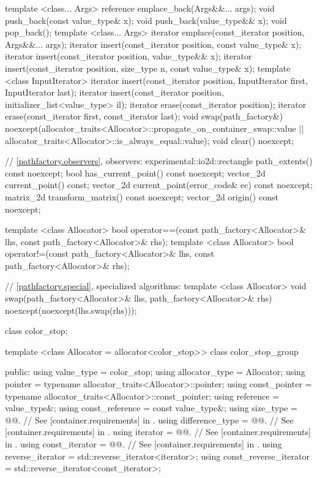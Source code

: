 \begin{codeblock}
{{{{{    template <class... Args>
    reference emplace_back(Args&&... args);
    void push_back(const value_type& x);
    void push_back(value_type&& x);
    void pop_back();
    template <class... Args>
    iterator emplace(const_iterator position, Args&&... args);
    iterator insert(const_iterator position, const value_type& x);
    iterator insert(const_iterator position, value_type&& x);
    iterator insert(const_iterator position, size_type n, const value_type& x);
    template <class InputIterator>
    iterator insert(const_iterator position, InputIterator first,
      InputIterator last);
    iterator insert(const_iterator position,
      initializer_list<value_type> il);
    iterator erase(const_iterator position);
    iterator erase(const_iterator first, const_iterator last);
    void swap(path_factory&)
      noexcept(allocator_traits<Allocator>::propagate_on_container_swap::value 
        || allocator_traits<Allocator>::is_always_equal::value);
    void clear() noexcept;

    // \ref{pathfactory.observers}, observers:
    experimental::io2d::rectangle path_extents() const noexcept;
    bool has_current_point() const noexcept;
    vector_2d current_point() const;
    vector_2d current_point(error_code& ec) const noexcept;
    matrix_2d transform_matrix() const noexcept;
    vector_2d origin() const noexcept;
  }

  template <class Allocator>
  bool operator==(const path_factory<Allocator>& lhs, 
    const path_factory<Allocator>& rhs);
  template <class Allocator>
  bool operator!=(const path_factory<Allocator>& lhs, 
    const path_factory<Allocator>& rhs);
  
  // \ref{pathfactory.special}, specialized algorithms:
  template <class Allocator>
  void swap(path_factory<Allocator>& lhs, path_factory<Allocator>& rhs)
    noexcept(noexcept(lhs.swap(rhs)));
  
  class color_stop;

  template <class Allocator = allocator<color_stop>>
  class color_stop_group {
  public:
    using value_type      = color_stop;
    using allocator_type  = Allocator;
    using pointer = typename allocator_traits<Allocator>::pointer;
    using const_pointer = typename allocator_traits<Allocator>::const_pointer;
    using reference = value_type&;
    using const_reference = const value_type&;
    using size_type       = @@. // See [container.requirements] in \cppseventeen.
    using difference_type = @@. // See [container.requirements] in \cppseventeen.
    using iterator        = @@. // See [container.requirements] in \cppseventeen.
    using const_iterator  = @@. // See [container.requirements] in \cppseventeen.
    using reverse_iterator       = std::reverse_iterator<iterator>;
    using const_reverse_iterator = std::reverse_iterator<const_iterator>;

}}}}}
\end{codeblock}
